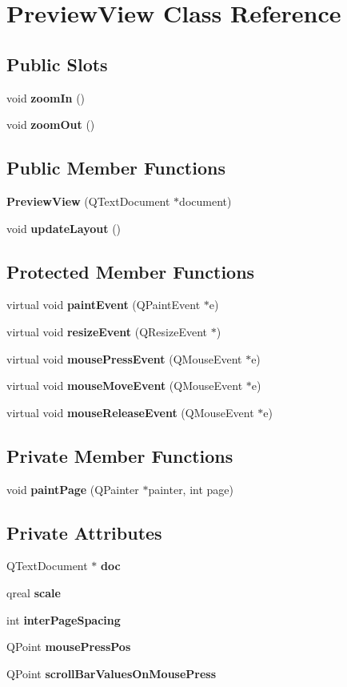 \section{Preview\-View Class Reference}
\label{classPreviewView}
\subsection*{Public Slots}
\begin{CompactItemize}
\item 
void {\bf zoom\-In} ()
\item 
void {\bf zoom\-Out} ()
\end{CompactItemize}
\subsection*{Public Member Functions}
\begin{CompactItemize}
\item 
{\bf Preview\-View} (QText\-Document $\ast$document)
\item 
void {\bf update\-Layout} ()
\end{CompactItemize}
\subsection*{Protected Member Functions}
\begin{CompactItemize}
\item 
virtual void {\bf paint\-Event} (QPaint\-Event $\ast$e)
\item 
virtual void {\bf resize\-Event} (QResize\-Event $\ast$)
\item 
virtual void {\bf mouse\-Press\-Event} (QMouse\-Event $\ast$e)
\item 
virtual void {\bf mouse\-Move\-Event} (QMouse\-Event $\ast$e)
\item 
virtual void {\bf mouse\-Release\-Event} (QMouse\-Event $\ast$e)
\end{CompactItemize}
\subsection*{Private Member Functions}
\begin{CompactItemize}
\item 
void {\bf paint\-Page} (QPainter $\ast$painter, int page)
\end{CompactItemize}
\subsection*{Private Attributes}
\begin{CompactItemize}
\item 
QText\-Document $\ast$ {\bf doc}
\item 
qreal {\bf scale}
\item 
int {\bf inter\-Page\-Spacing}
\item 
QPoint {\bf mouse\-Press\-Pos}
\item 
QPoint {\bf scroll\-Bar\-Values\-On\-Mouse\-Press}
\end{CompactItemize}



